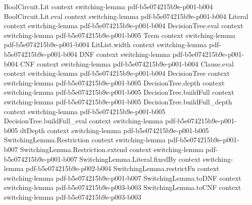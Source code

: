 \begin{theorem}
\label{LMN.restricted_has_small_cnf_of_dtDepth_le}
\leanok
{}
\proofstep
  {BoolCircuit.Lit}
  {context}
  {switching-lemma}
  {pdf-b5e074215b9e-p001-b004}
\proofstep
  {BoolCircuit.Lit.eval}
  {context}
  {switching-lemma}
  {pdf-b5e074215b9e-p001-b004}
\proofstep
  {Literal}
  {context}
  {switching-lemma}
  {pdf-b5e074215b9e-p001-b004}
\proofstep
  {DecisionTree.eval}
  {context}
  {switching-lemma}
  {pdf-b5e074215b9e-p001-b005}
\proofstep
  {Term}
  {context}
  {switching-lemma}
  {pdf-b5e074215b9e-p001-b004}
\proofstep
  {LitList.width}
  {context}
  {switching-lemma}
  {pdf-b5e074215b9e-p001-b004}
\proofstep
  {DNF}
  {context}
  {switching-lemma}
  {pdf-b5e074215b9e-p001-b004}
\proofstep
  {CNF}
  {context}
  {switching-lemma}
  {pdf-b5e074215b9e-p001-b004}
\proofstep
  {Clause.eval}
  {context}
  {switching-lemma}
  {pdf-b5e074215b9e-p001-b004}
\proofstep
  {DecisionTree}
  {context}
  {switching-lemma}
  {pdf-b5e074215b9e-p001-b005}
\proofstep
  {DecisionTree.depth}
  {context}
  {switching-lemma}
  {pdf-b5e074215b9e-p001-b005}
\proofstep
  {DecisionTree.buildFull}
  {context}
  {switching-lemma}
  {pdf-b5e074215b9e-p001-b005}
\proofstep
  {DecisionTree.buildFull_depth}
  {context}
  {switching-lemma}
  {pdf-b5e074215b9e-p001-b005}
\proofstep
  {DecisionTree.buildFull_eval}
  {context}
  {switching-lemma}
  {pdf-b5e074215b9e-p001-b005}
\proofstep
  {dtDepth}
  {context}
  {switching-lemma}
  {pdf-b5e074215b9e-p001-b005}
\proofstep
  {SwitchingLemma.Restriction}
  {context}
  {switching-lemma}
  {pdf-b5e074215b9e-p001-b007}
\proofstep
  {SwitchingLemma.Restriction.extend}
  {context}
  {switching-lemma}
  {pdf-b5e074215b9e-p001-b007}
\proofstep
  {SwitchingLemma.Literal.fixedBy}
  {context}
  {switching-lemma}
  {pdf-b5e074215b9e-p002-b004}
\proofstep
  {SwitchingLemma.restrictFn}
  {context}
  {switching-lemma}
  {pdf-b5e074215b9e-p001-b007}
\proofstep
  {SwitchingLemma.toDNF}
  {context}
  {switching-lemma}
  {pdf-b5e074215b9e-p003-b003}
\proofstep
  {SwitchingLemma.toCNF}
  {context}
  {switching-lemma}
  {pdf-b5e074215b9e-p003-b003}
\proofstep

\end{theorem}
